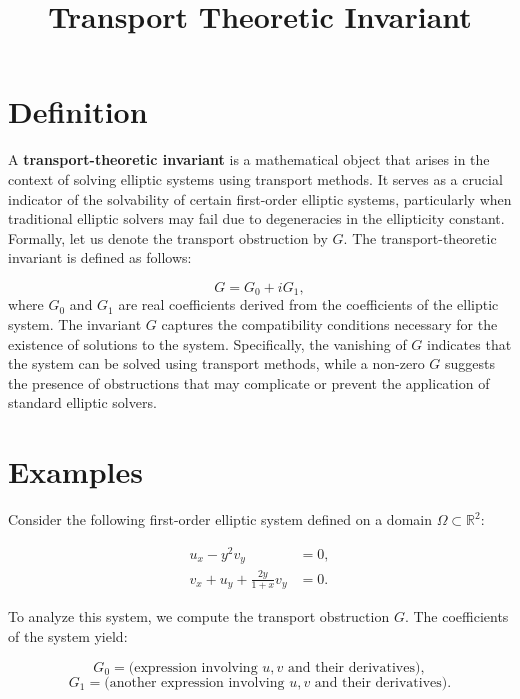 \documentclass[11pt,a4paper]{article}
\title{Transport Theoretic Invariant}
\date{}
\begin{document}
\maketitle
\section{Definition}
A \textbf{transport-theoretic invariant} is a mathematical object that arises in the context of solving elliptic systems using transport methods. It serves as a crucial indicator of the solvability of certain first-order elliptic systems, particularly when traditional elliptic solvers may fail due to degeneracies in the ellipticity constant. Formally, let us denote the transport obstruction by $G$. The transport-theoretic invariant is defined as follows:

\begin{equation}
G = G_0 + i G_1,
\end{equation}
where $G_0$ and $G_1$ are real coefficients derived from the coefficients of the elliptic system. The invariant $G$ captures the compatibility conditions necessary for the existence of solutions to the system. Specifically, the vanishing of $G$ indicates that the system can be solved using transport methods, while a non-zero $G$ suggests the presence of obstructions that may complicate or prevent the application of standard elliptic solvers.

\section{Examples}
Consider the following first-order elliptic system defined on a domain $\Omega \subset \mathbb{R}^2$:

\begin{equation}
\begin{aligned}
u_x - y^2 v_y &= 0, \\
v_x + u_y + \frac{2y}{1+x} v_y &= 0.
\end{aligned}
\end{equation}

To analyze this system, we compute the transport obstruction $G$. The coefficients of the system yield:

\begin{equation}
G_0 = \text{(expression involving } u, v \text{ and their derivatives)},
\end{equation}
\begin{equation}
G_1 = \text{(another expression involving } u, v \text{ and their derivatives)}.
\end{equation}
\end{document}
